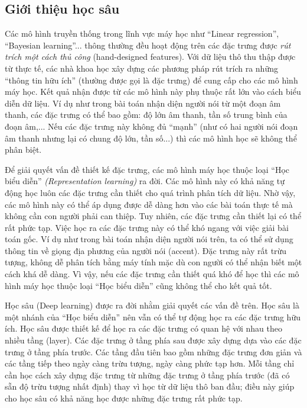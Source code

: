 \subsection{Giới thiệu học sâu}
	Các mô hình truyền thống trong lĩnh vực máy học như ``Linear regression'', ``Bayesian learning''... thông thường đều hoạt động trên các đặc trưng được \textit{rút trích một cách thủ công} (hand-designed features).
	Với dữ liệu thô thu thập được từ thực tế, các nhà khoa học xây dựng các phương pháp rút trích ra những ``thông tin hữu ích'' (thường được gọi là đặc trưng) để cung cấp cho các mô hình máy học.
	Kết quả nhận được từ các mô hình này phụ thuộc rất lớn vào cách biểu diễn dữ liệu.
	Ví dụ như trong bài toán nhận diện người nói từ một đoạn âm thanh, các đặc trưng có thể bao gồm: độ lớn âm thanh, tần số trung bình của đoạn âm,...
	Nếu các đặc trưng này không đủ ``mạnh'' (như có hai người nói đoạn âm thanh nhưng lại có chung độ lớn, tần số...) thì các mô hình học sẽ không thể phân biệt.
		
	Để giải quyết vấn đề thiết kế đặc trưng, các mô hình máy học thuộc loại ``Học biểu diễn'' \textit{(Representation learning)} ra đời.
	Các mô hình này có khả năng tự động học luôn các đặc trưng cần thiết cho quá trình phân tích dữ liệu.
	Nhờ vậy, các mô hình này có thể áp dụng được dễ dàng hơn vào các bài toán thực tế mà không cần con người phải can thiệp.
	Tuy nhiên, các đặc trưng cần thiết lại có thể rất phức tạp.
	Việc học ra các đặc trưng này có thể khó ngang với việc giải bài toán gốc.
	Ví dụ như trong bài toán nhận diện người nói trên, ta có thể sử dụng thông tin về giọng địa phương của người nói (accent).
	Đặc trưng này rất trừu tượng, không dễ phân tích bằng máy tính mặc dù con người có thể nhận biết một cách khá dễ dàng.
	Vì vậy, nếu các đặc trưng cần thiết quá khó để học thì các mô hình máy học thuộc loại ``Học biểu diễn'' cũng không thể cho kết quả tốt.

	Học sâu (Deep learning) được ra đời nhằm giải quyết các vấn đề trên.
	Học sâu là một nhánh của ``Học biểu diễn'' nên vẫn có thể tự động học ra các đặc trưng hữu ích.
	Học sâu được thiết kế để học ra các đặc trưng có quan hệ với nhau theo nhiều tầng (layer).
	Các đặc trưng ở tầng phía sau được xây dựng dựa vào các đặc trưng ở tầng phía trước.
	Các tầng đầu tiên bao gồm những đặc trưng đơn giản và các tầng tiếp theo ngày càng trừu tượng, ngày càng phức tạp hơn.
	Mỗi tầng chỉ cần học cách xây dựng đặc trưng từ những đặc trưng ở tầng phía trước (đã có sẵn độ trừu tượng nhất định) thay vì học từ dữ liệu thô ban đầu; điều này giúp cho học sâu có khả năng học được những đặc trưng rất phức tạp.
	
